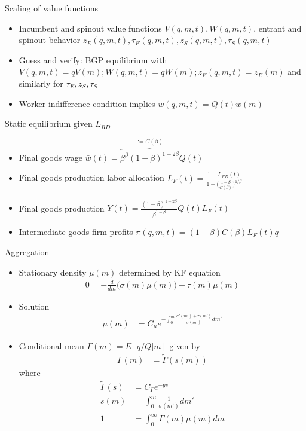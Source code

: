 \documentclass[english,usenames,dvipsnames]{beamer}
\begin{document}
\begin{frame}{Scaling of value functions}\label{scaling_of_value_functions}
\hyperlink{closing_the_model}{}
\begin{itemize}
\item Incumbent and spinout value functions $V(q,m,t),W(q,m,t)$, entrant and spinout behavior $z_E(q,m,t),\tau_E(q,m,t),z_S(q,m,t),\tau_S(q,m,t)$ 
\item Guess and verify: BGP equilibrium with $V(q,m,t) = qV(m); W(q,m,t) = qW(m); z_E(q,m,t) = z_E(m)$ and similarly for $\tau_E,z_S,\tau_S$
\item Worker indifference condition implies $w(q,m,t) = Q(t) w(m)$ 
\end{itemize}
\end{frame}

\begin{frame}{Static equilibrium given $L_{RD}$}\label{static_eq_conditions}
\hyperlink{closing_the_model}{}
\begin{itemize}
\item Final goods wage $\bar{w}(t) = \overbrace{\beta^{\beta} (1-\beta)^{1-2\beta}}^{:= C(\beta)} Q(t)$
\item Final goods production labor allocation $L_F(t) = \frac{1 - L_{RD}(t)}{1 + \big(\frac{1-\beta}{C(\beta)}\big)^{1/\beta}}$
\item Final goods production $Y(t) = \frac{(1-\beta)^{1-2\beta}}{\beta^{1-\beta}} Q(t) L_F(t)$
\item Intermediate goods firm profits $\pi(q,m,t) = (1-\beta) C(\beta) L_F(t) q $ 
\end{itemize}
\end{frame}

\begin{frame}{Aggregation}\label{aggregation}
\hyperlink{closing_the_model}{}
\small
\begin{itemize}
\item Stationary density $\mu(m)$ determined by KF equation
\begin{align*}
0 = - \frac{d}{dm} \Big( \sigma(m) \mu(m) \Big) - \tau(m) \mu(m)
\end{align*}
\item Solution
\begin{align*}
\mu(m) &= C_\mu e^{-\int_0^m \frac{\sigma'(m') + \tau(m')}{\sigma(m')}dm'} 
\end{align*}
\item Conditional mean $\Gamma(m) = E[q/Q | m]$ given by 
\begin{align*}
\Gamma(m) &= \tilde{\Gamma}(s(m))
\end{align*}
where
\begin{align*}
\tilde{\Gamma}(s) &= C_{\Gamma} e^{-gs} \\
s(m) &= \int_0^m \frac{1}{\sigma(m')} dm' \\
1 &= \int_0^{\infty} \Gamma(m) \mu(m) dm
\end{align*}
\end{itemize}
\end{frame}
\end{document}
